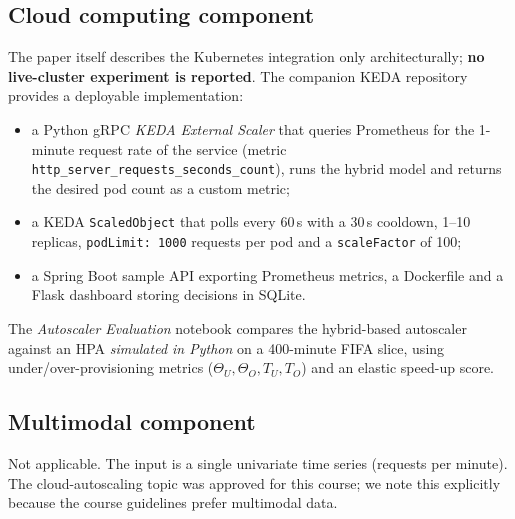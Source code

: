 \documentclass[11pt,a4paper]{article}
\begin{document}
\subsection{Cloud computing component}
The paper itself describes the Kubernetes integration only architecturally; \textbf{no live-cluster experiment is reported}. The companion KEDA repository provides a deployable implementation:
\begin{itemize}
\item a Python gRPC \emph{KEDA External Scaler} that queries Prometheus for the 1-minute request rate of the service (metric \texttt{http\_server\_requests\_seconds\_count}), runs the hybrid model and returns the desired pod count as a custom metric;
\item a KEDA \texttt{ScaledObject} that polls every 60\,s with a 30\,s cooldown, 1--10 replicas, \texttt{podLimit: 1000} requests per pod and a \texttt{scaleFactor} of 100;
\item a Spring Boot sample API exporting Prometheus metrics, a Dockerfile and a Flask dashboard storing decisions in SQLite.
\end{itemize}
The \emph{Autoscaler Evaluation} notebook compares the hybrid-based autoscaler against an HPA \emph{simulated in Python} on a 400-minute FIFA slice, using under/over-provisioning metrics (\(\Theta_U,\Theta_O,T_U,T_O\)) and an elastic speed-up score.

\subsection{Multimodal component}
Not applicable. The input is a single univariate time series (requests per minute). The cloud-autoscaling topic was approved for this course; we note this explicitly because the course guidelines prefer multimodal data.
\end{document}
